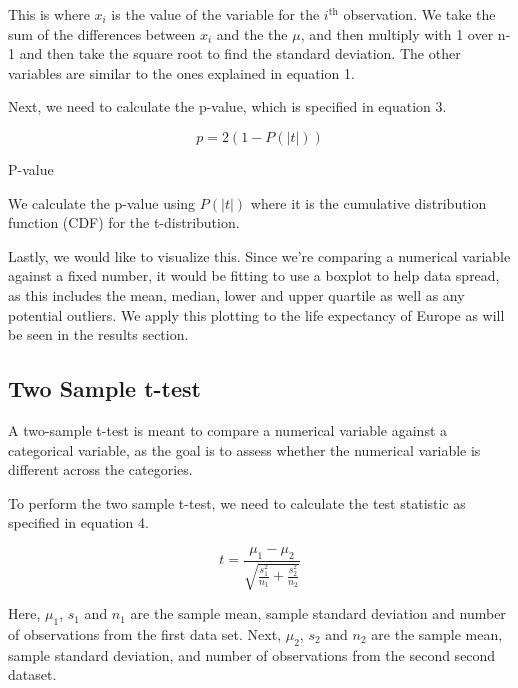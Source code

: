 \documentclass[a4paper, twocolumn]{article}
\begin{document}
This is where $x_i$ is the value of the variable for the $i^{\text{th}}$ observation. We take the sum of the
differences between $x_i$ and the the $\mu$, and then multiply with 1 over n-1 and then take the square root 
to find the standard deviation. The other variables are similar to the ones explained in equation 1. 

Next, we need to calculate the p-value, which is specified in equation 3.

\begin{equation}
    p = 2(1 - P(|t|))
    \label{eq:p-value}
    \end{equation}
    
    \begin{center}
    P-value
    \end{center}

We calculate the p-value using $P ( \left| t \right|)$ where it is the cumulative distribution function (CDF) for
the t-distribution. 

Lastly, we would like to visualize this. Since we're comparing a numerical variable against a fixed number, it would
be fitting to use a boxplot to help data spread, as this includes the mean, median, lower and upper quartile as well
as any potential outliers. We apply this plotting to the life expectancy of Europe as will be seen in the results
section.

\subsection{Two Sample t-test}
A two-sample t-test is meant to compare a numerical variable against a categorical variable, as the goal is to assess
whether the numerical variable is different across the categories. 

To perform the two sample t-test, we need to calculate the test statistic as specified in equation 4.

\begin{equation}
    t = \frac{\mu_1 - \mu_2}{\sqrt{\frac{s_1^2}{n_1} + \frac{s_2^2}{n_2}}}
    \label{eq:t-test}
\end{equation}
\begin{center}
\end{center}

Here, $\mu_1$, $s_1$ and $n_1$ are the sample mean, sample standard deviation and number of observations from the 
first data set. Next, $\mu_2$, $s_2$ and $n_2$ are the sample mean, sample standard deviation, and number of 
observations from the second second dataset. 
\end{document}
